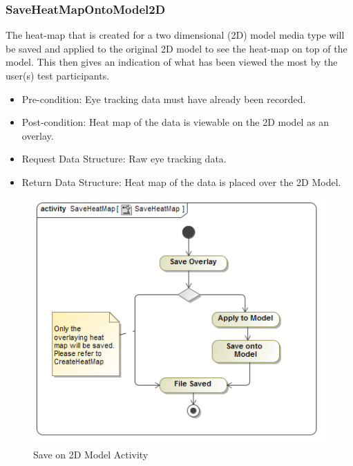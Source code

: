 	\subsubsection{SaveHeatMapOntoModel2D}
The heat-map that is created for a two dimensional (2D) model media type will be saved and applied to the original 2D model to see the heat-map on top of the model. This then gives an indication of what has been viewed the most by the user(s) test participants.
	\begin{itemize}
		\item Pre-condition: Eye tracking data must have already been recorded.
		\item Post-condition: Heat map of the data is viewable on the 2D model as an overlay.
		\item Request Data Structure: Raw eye tracking data.
		\item Return Data Structure: Heat map of the data is placed over the 2D Model.
	\end{itemize}
	\begin{figure}[!ht]
		\centering	
		\includegraphics[scale=0.5,width=15cm,keepaspectratio]{Diagrams/Activity_Diagram__SaveHeatMap__SaveHeatMap.png}	
		\caption{Save on 2D Model Activity}
	\end{figure}

